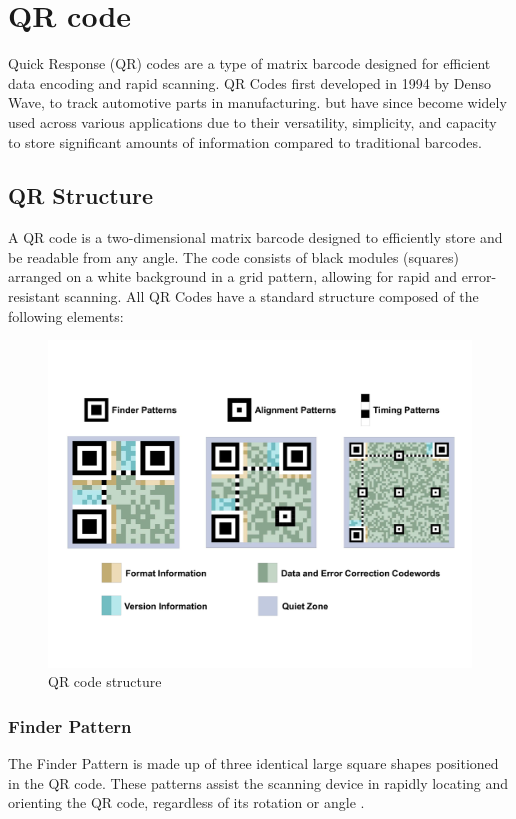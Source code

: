 \section{QR code}
Quick Response (QR) codes are a type of matrix barcode designed for efficient data encoding and rapid scanning. QR Codes first developed in 1994 by Denso Wave, to track automotive parts in manufacturing. but have since become widely used across various applications due to their versatility, simplicity, and capacity to store significant amounts of information compared to traditional barcodes.

\subsection{QR Structure}
A QR code is a two-dimensional matrix barcode designed to efficiently store and be readable from any angle. The code consists of black modules (squares) arranged on a white background in a grid pattern, allowing for rapid and error-resistant scanning. All QR Codes have a standard structure composed of the following elements:

\begin{figure}[h] %
	\centering
	\includegraphics[width=15cm]{assets/ch2/qr_code_structure}
	\caption{QR code structure}
	\label{QR_code_structure}
\end{figure}

\subsubsection*{Finder Pattern}
The Finder Pattern is made up of three identical large square shapes positioned in the QR code. These patterns assist the scanning device in rapidly locating and orienting the QR code, regardless of its rotation or angle \cite{Tiwari2016}.

